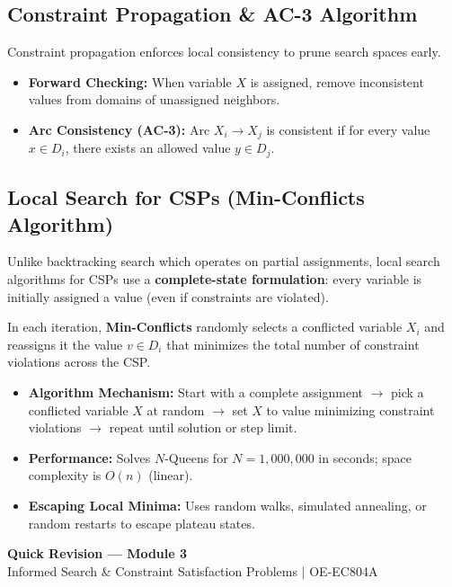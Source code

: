 \documentclass[12pt,a4paper]{article}
\begin{document}
\subsection{Constraint Propagation \& AC-3 Algorithm}
Constraint propagation enforces local consistency to prune search spaces early.

\begin{itemize}[leftmargin=*, itemsep=3pt]
  \item \textbf{Forward Checking:} When variable $X$ is assigned, remove inconsistent values from domains of unassigned neighbors.
  \item \textbf{Arc Consistency (AC-3):} Arc $X_i \to X_j$ is consistent if for every value $x \in D_i$, there exists an allowed value $y \in D_j$.
\end{itemize}

\subsection{Local Search for CSPs (Min-Conflicts Algorithm)}
Unlike backtracking search which operates on partial assignments, local search algorithms for CSPs use a \textbf{complete-state formulation}: every variable is initially assigned a value (even if constraints are violated).

\begin{tcolorbox}[defbox, title={Min-Conflicts Heuristic}]
  In each iteration, \textbf{Min-Conflicts} randomly selects a conflicted variable $X_i$ and reassigns it the value $v \in D_i$ that minimizes the total number of constraint violations across the CSP.
\end{tcolorbox}

\begin{itemize}[leftmargin=*, itemsep=3pt]
  \item \textbf{Algorithm Mechanism:} Start with a complete assignment $\to$ pick a conflicted variable $X$ at random $\to$ set $X$ to value minimizing constraint violations $\to$ repeat until solution or step limit.
  \item \textbf{Performance:} Solves $N$-Queens for $N = 1,000,000$ in seconds; space complexity is $O(n)$ (linear).
  \item \textbf{Escaping Local Minima:} Uses random walks, simulated annealing, or random restarts to escape plateau states.
\end{itemize}

\newpage
\begin{center}
  {\large\bfseries\color{myred} Quick Revision --- Module 3}\\[3pt]
  {\small\color{mydark} Informed Search \& Constraint Satisfaction Problems $|$ OE-EC804A}
\end{center}
\noindent{\color{myred}\rule{\linewidth}{1.2pt}}
\vspace{4pt}
\end{document}
